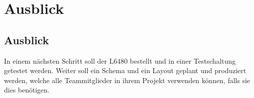 \ifSTANDALONE
\section{Ausblick}
\fi
\ifEMBED
\subsection{Ausblick}
\fi
	In einem nächsten Schritt soll der L6480 bestellt und in einer 
    Testschaltung getestet werden. Weiter soll ein Schema und ein Layout 
    geplant und produziert werden, welche alle Teammitglieder in ihrem Projekt 
    verwenden können, falls sie dies benötigen. 
